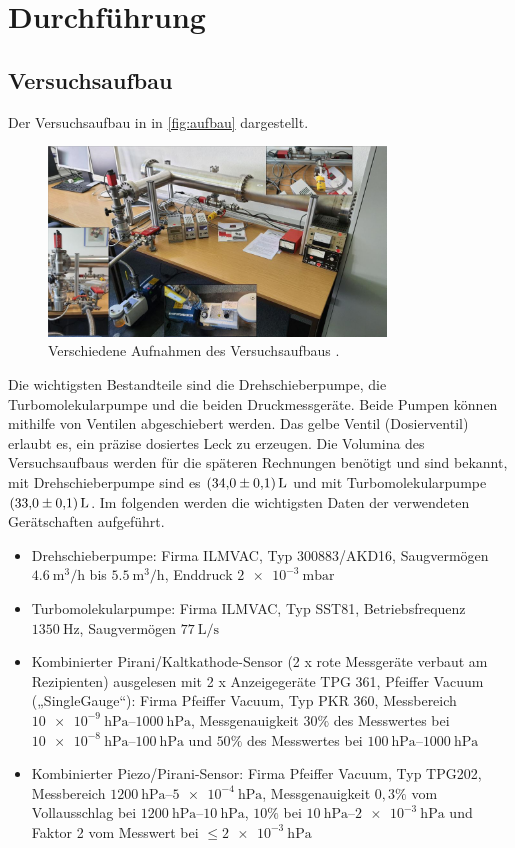 \section{Durchführung}
\label{sec:Durchführung}

\subsection{Versuchsaufbau}
Der Versuchsaufbau in in \autoref{fig:aufbau} dargestellt.\\
\begin{figure}[H]
    \centering
    \includegraphics[width=0.8\textwidth]{content/pics/aufbau.png}
    \caption{Verschiedene Aufnahmen des Versuchsaufbaus \cite{V70}.}
    \label{fig:aufbau}
\end{figure}
Die wichtigsten Bestandteile sind die Drehschieberpumpe, die Turbomolekularpumpe und die beiden Druckmessgeräte.
Beide Pumpen können mithilfe von Ventilen abgeschiebert werden. Das gelbe Ventil (Dosierventil) erlaubt es, ein präzise dosiertes
Leck zu erzeugen.
Die Volumina des Versuchsaufbaus werden für die späteren Rechnungen benötigt und sind bekannt, mit Drehschieberpumpe
sind es $\qty{34.0+-0.1}{\liter}$ und mit Turbomolekularpumpe $\qty{33.0+-0.1}{\liter}$.
Im folgenden werden die wichtigsten Daten der verwendeten Gerätschaften aufgeführt. \cite{V70}
\begin{itemize}
    \item Drehschieberpumpe: Firma ILMVAC, Typ 300883/AKD16, Saugvermögen $\qty{4.6}{\cubic\metre\per\hour}$ bis $\qty{5.5}{\cubic\metre\per\hour}$,
    Enddruck $\qty{2e-3}{\milli\bar}$
    \item Turbomolekularpumpe: Firma ILMVAC, Typ SST81, Betriebsfrequenz $\qty{1350}{\hertz}$, Saugvermögen $\qty{77}{\liter\per\second}$
    \item Kombinierter Pirani/Kaltkathode-Sensor (2 x rote Messgeräte verbaut am Rezipienten) ausgelesen mit 2 x Anzeigegeräte TPG 361, Pfeiffer Vacuum („SingleGauge“):
    Firma Pfeiffer Vacuum, Typ PKR 360, Messbereich $\SIrange{10 e-9}{1000}{\hecto\pascal}$, Messgenauigkeit $30 \%$ des Messwertes bei
    $\SIrange{10 e-8}{100}{\hecto\pascal}$ und $50 \%$ des Messwertes bei $\SIrange{100}{1000}{\hecto\pascal}$
    \item Kombinierter Piezo/Pirani-Sensor: Firma Pfeiffer Vacuum, Typ TPG202, Messbereich $\SIrange{1200}{5 e-4}{\hecto\pascal}$,
    Messgenauigkeit $0,3 \%$ vom Vollausschlag bei $\SIrange{1200}{10}{\hecto\pascal}$, $10\%$ bei $\SIrange{10}{2 e-3}{\hecto\pascal}$
    und Faktor 2 vom Messwert bei $\leq \SI{2 e-3}{\hecto\pascal}$
\end{itemize}

